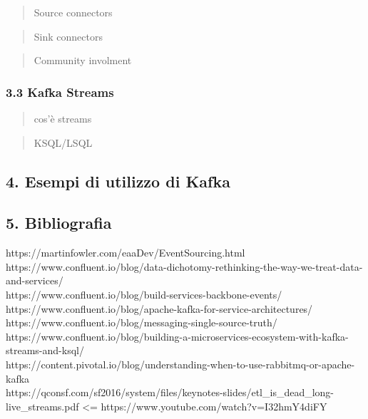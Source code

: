 \documentclass[]{article}
\begin{document}
\begin{quote}
Source connectors
\end{quote}

\begin{quote}
Sink connectors
\end{quote}

\begin{quote}
Community involment
\end{quote}

\subsubsection{3.3 Kafka Streams}\label{kafka-streams}

\begin{quote}
cos'è streams
\end{quote}

\begin{quote}
KSQL/LSQL
\end{quote}

\subsection{4. Esempi di utilizzo di
Kafka}\label{esempi-di-utilizzo-di-kafka}

\newpage

\subsection{5. Bibliografia}\label{bibliografia}

https://martinfowler.com/eaaDev/EventSourcing.html\\
https://www.confluent.io/blog/data-dichotomy-rethinking-the-way-we-treat-data-and-services/\\
https://www.confluent.io/blog/build-services-backbone-events/\\
https://www.confluent.io/blog/apache-kafka-for-service-architectures/\\
https://www.confluent.io/blog/messaging-single-source-truth/\\
https://www.confluent.io/blog/building-a-microservices-ecosystem-with-kafka-streams-and-ksql/\\
https://content.pivotal.io/blog/understanding-when-to-use-rabbitmq-or-apache-kafka\\
https://qconsf.com/sf2016/system/files/keynotes-slides/etl\_is\_dead\_long-live\_streams.pdf
\textless{}= https://www.youtube.com/watch?v=I32hmY4diFY
\end{document}
